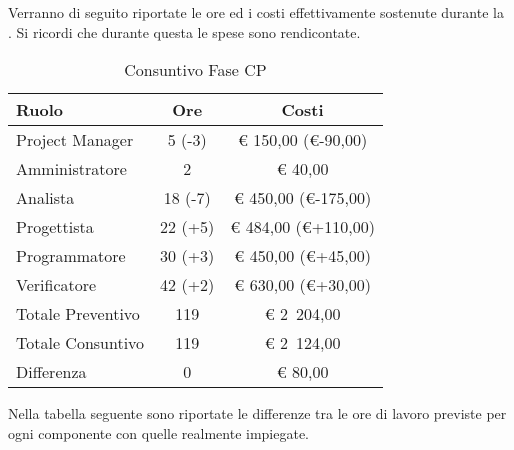 			Verranno di seguito riportate le ore ed i costi effettivamente sostenute durante la . Si ricordi che durante questa  le spese sono rendicontate.
			\begin{table}[H]
				\begin{center}
					\begin{tabular}{| l | c | c |}
						\hline
						Ruolo 				& Ore 		& Costi  \\ \hline
						
						Project Manager		& 5 (-3)	& \euro{} 150,00 (\euro{}-90,00)	\\
						Amministratore 		& 2 		& \euro{} 40,00 	\\
						Analista	 		& 18 (-7)	& \euro{} 450,00 (\euro{}-175,00)	\\
						Progettista 		& 22 (+5)	& \euro{} 484,00 (\euro{}+110,00) 	\\
						Programmatore		& 30 (+3)	& \euro{} 450,00 (\euro{}+45,00)	\\
						Verificatore		& 42 (+2)	& \euro{} 630,00 (\euro{}+30,00)	\\ \hline \hline
						
						Totale Preventivo	& 119 		& \euro{} 2~204,00 	\\ \hline
						Totale Consuntivo	& 119 		& \euro{} 2~124,00  \\ \hline
						Differenza			& 0 		& \euro{} 80,00 	\\ \hline
					\end{tabular}
				\end{center}
				\caption{Consuntivo Fase CP}
			\end{table}


			Nella tabella seguente sono riportate le differenze tra le ore di lavoro previste per ogni componente con quelle realmente impiegate.

